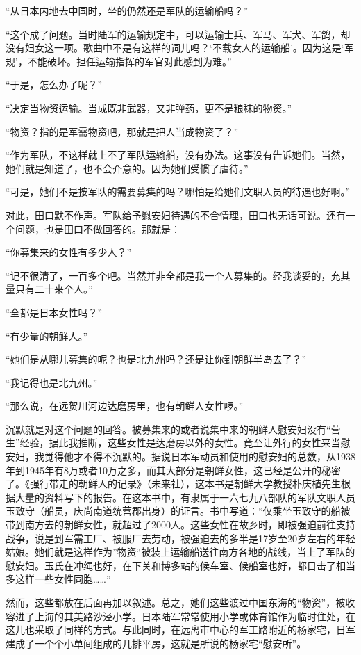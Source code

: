 \documentclass[12pt,UTF8]{ctexbook}
\begin{document}
“从日本内地去中国时，坐的仍然还是军队的运输船吗？”

“这个成了问题。当时陆军的运输规定中，可以运输士兵、军马、军犬、军鸽，却没有妇女这一项。歌曲中不是有这样的词儿吗？‘不载女人的运输船’。因为这是‘军规’，不能破坏。担任运输指挥的军官对此感到为难。”

“于是，怎么办了呢？”

“决定当物资运输。当成既非武器，又非弹药，更不是粮秣的物资。”

“物资？指的是军需物资吧，那就是把人当成物资了？”

“作为军队，不这样就上不了军队运输船，没有办法。这事没有告诉她们。当然，她们就是知道了，也不会介意的。因为她们受惯了虐待。”

“可是，她们不是按军队的需要募集的吗？哪怕是给她们文职人员的待遇也好啊。”

对此，田口默不作声。军队给予慰安妇待遇的不合情理，田口也无话可说。还有一个问题，也是田口不做回答的。那就是：

“你募集来的女性有多少人？”

“记不很清了，一百多个吧。当然并非全都是我一个人募集的。经我谈妥的，充其量只有二十来个人。”

“全都是日本女性吗？”

“有少量的朝鲜人。”

“她们是从哪儿募集的呢？也是北九州吗？还是让你到朝鲜半岛去了？”

“我记得也是北九州。”

“那么说，在远贺川河边达磨房里，也有朝鲜人女性啰。”

沉默就是对这个问题的回答。被募集来的或者说集中来的朝鲜人慰安妇没有“营生”经验，据此我推断，这些女性是达磨房以外的女性。竟至让外行的女性来当慰安妇，我觉得他才不得不沉默的。据说日本军动员和使用的慰安妇的总数，从1938年到1945年有8万或者10万之多，而其大部分是朝鲜女性，这已经是公开的秘密了。《强行带走的朝鲜人的记录》（未来社），这本书是朝鲜大学教授朴庆植先生根据大量的资料写下的报告。在这本书中，有隶属于一六七九八部队的军队文职人员玉致守（船员，庆尚南道统营郡出身）的证言。书中写道：“仅乘坐玉致守的船被带到南方去的朝鲜女性，就超过了2000人。这些女性在故乡时，即被强迫前往支持战争，说是到军需工厂、被服厂去劳动，被强迫去的多半是17岁至20岁左右的年轻姑娘。她们就是这样作为”物资“被装上运输船送往南方各地的战线，当上了军队的慰安妇。玉氏在冲绳也好，在下关和博多站的候车室、候船室也好，都目击了相当多这样一些女性同胞……”

然而，这些都放在后面再加以叙述。总之，她们这些渡过中国东海的“物资”，被收容进了上海的其美路沙泾小学。日本陆军常常使用小学或体育馆作为临时住处，在这儿也采取了同样的方式。与此同时，在远离市中心的军工路附近的杨家宅，日军建成了一个个小单间组成的几排平房，这就是所说的杨家宅“慰安所”。
\end{document}
